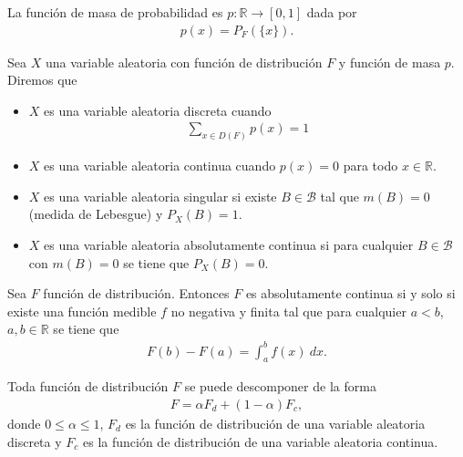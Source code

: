 \begin{defi}
    La función de masa de probabilidad es $p: \mathbb{R} \longrightarrow [0,1]$ dada por
    \begin{align*}
        p(x) = P_F(\{x\}).
    \end{align*}
\end{defi}

\begin{defi}
    Sea $X$ una variable aleatoria con función de distribución $F$ y función de masa $p$. Diremos que
    \begin{itemize}
        \item $X$ es una variable aleatoria discreta cuando
        \begin{align*}
            \sum_{x \in D(F)} p(x) = 1
        \end{align*}
        \item $X$ es una variable aleatoria continua cuando $p(x) = 0$ para todo $x \in \mathbb{R}$.
        \item $X$ es una variable aleatoria singular si existe $B \in \mathcal{B}$ tal que $m(B) = 0$ (medida de Lebesgue) y $P_X(B) = 1$.
        \item $X$ es una variable aleatoria absolutamente continua si para cualquier $B \in \mathcal{B}$ con $m(B) = 0$ se tiene que $P_X(B) = 0$.
    \end{itemize}
\end{defi}

\begin{teo}
Sea $F$ función de distribución. Entonces $F$ es absolutamente continua si y solo si existe una función medible $f$ no negativa y finita tal que para cualquier $a < b$, $a,b \in \mathbb{R}$ se tiene que
\begin{align*}
    F(b) - F(a) = \int_{a}^{b} f(x) \ dx.
\end{align*}
\end{teo}

\begin{teo}
    Toda función de distribución $F$ se puede descomponer de la forma 
    \begin{align*}
        F = \alpha F_d + (1-\alpha)F_c, 
    \end{align*}
    donde $0 \leq \alpha \leq 1$, $F_d$ es la función de distribución de una variable aleatoria discreta y $F_c$ es la función de distribución de una variable aleatoria continua.
\end{teo}

